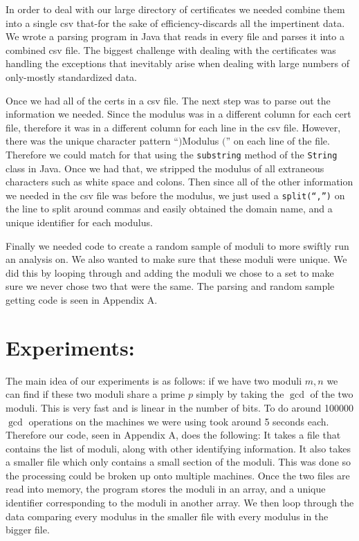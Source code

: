 \documentclass[11pt,twoside]{article}
\newcommand{\ty}[1]{\texttt{#1}}
\begin{document}
\begin{multicols}{2}
In order to deal with our large directory of certificates we needed combine them
into
a single csv that-for the sake of efficiency-discards all the impertinent data.
We wrote a parsing program in Java that reads in every file and parses it into a
combined csv file. The biggest challenge with dealing with the certificates was
handling the exceptions that inevitably arise when dealing with large numbers of
only-mostly standardized data. 

Once we had all of the certs in a csv file. The next step was to parse out the
information we needed. Since the modulus was in a different column for each cert
file, therefore it was in a different column for each line in the csv file.
However, there was the unique character pattern ``$)$Modulus $($'' on each line
of the file. Therefore we could match for that using the \ty{substring} method 
of the \ty{String} class in Java. Once we had that, we stripped the modulus of 
all extraneous characters such as white space and colons. Then since all of the
other information we needed in the csv file was before the modulus, we just used
a \ty{split(``,'')} on the line to split around commas and easily obtained the
domain name, and a unique identifier for each modulus.

Finally we needed code to create a random sample of moduli to more swiftly run
an analysis on. We also wanted to make sure that these moduli were unique. We
did this by looping through and adding the moduli we chose to a set to make sure
we never chose two that were the same. The parsing and random sample getting
code is seen in Appendix A.


\section{Experiments:}
The main idea of our experiments is as follows: if we have two moduli $m, n$ we
can find if these two moduli share a prime $p$ simply by taking the $\gcd$ of
the two moduli. This is very fast and is linear in the number of bits. To do
around 100000 $\gcd$ operations on the machines we were using took around 5
seconds each. Therefore our code, seen in Appendix A, does the following: It
takes a file that contains the list of moduli, along with other identifying 
information. It also takes a smaller file which only contains a small section of
the moduli. This was done so the processing could be broken up onto multiple
machines. Once the two files are read into memory, the program stores the moduli
in an array, and a unique identifier corresponding to the moduli in another
array. We then loop through the data comparing every modulus in the smaller file
with every modulus in the bigger file.


\end{multicols}
\end{document}
